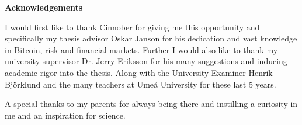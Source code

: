 \vspace*{7cm}

\centering \textbf{Acknowledgements}

I would first like to thank Cinnober for giving me this opportunity and specifically my thesis advisor Oskar Janson for his dedication and vast knowledge in Bitcoin, risk and financial markets.
Further I would also like to thank my university supervisor Dr. Jerry Eriksson for his many suggestions and inducing academic rigor into the thesis. Along with the University Examiner Henrik Bj\"{o}rklund and the many teachers at Umeå University for these last 5 years. 
  
A special thanks to my parents for always being there and instilling a curiosity in me and an inspiration for science. 
